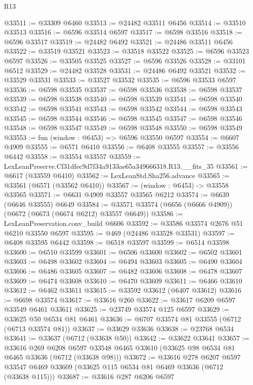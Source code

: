 \begin{lexlean}{R13}
\begin{coremodule}
@33511 := @33309 @6460
@33513 := @24482 @33511 @6456
@33514 := @33510 @33513
@33516 := @6596 @33514 @6597
@33517 := @6598 @33516
@33518 := @6596 @33517
@33519 := @24482 @6492
@33521 := @24486 @33511 @6456
@33522 := @33519 @33521
@33523 := @33518 @33522
@33525 := @6596 @33523 @6597
@33526 := @33505 @33525
@33527 := @6596 @33526
@33528 := @33101 @6512
@33529 := @24482 @33528
@33531 := @24486 @6492 @33521
@33532 := @33529 @33531
@33533 := @33527 @33532
@33535 := @6596 @33533 @6597
@33536 := @6598 @33535
@33537 := @6598 @33536
@33538 := @6598 @33537
@33539 := @6598 @33538
@33540 := @6598 @33539
@33541 := @6598 @33540
@33542 := @6598 @33541
@33543 := @6598 @33542
@33544 := @6598 @33543
@33545 := @6598 @33544
@33546 := @6598 @33545
@33547 := @6598 @33546
@33548 := @6598 @33547
@33549 := @6598 @33548
@33550 := @6598 @33549
@33553 := fun (window : @6453) => @6596 @33550 @6597
@33554 := @6607 @4909
@33555 := @6571 @6410
@33556 := @6408 @33555
@33557 := @33556 @6442
@33558 := @33554 @33557
@33559 := LexLeanPreserve.Cf31dfec9d7f34a9133ae65a349666318.R13.__fits_35
@33561 := @6617 (@33559 @6410)
@33562 := LexLeanStd.Sha256.advance
@33565 := @33561 (@6571 (@33562 @6410))
@33567 := (window : @6453) -> @33558 @33565
@33571 := @6631 @4909 @33557 @33565 @6212
@33574 := @6639 (@6646 @33555) @6649
@33584 := @33571 @33574 (@6656 (@6666 @4909)) (@6672 (@6673 (@6674 @6212) @33557 @6649))
@33586 := LexLeanPreservation.conv_build @6606
@33592 := @33586 @33574 @2676 @51 @6210 @33550 @6597
@33595 := @469 (@24486 @33528 @33531)
@33597 := @6408 @33595 @6442
@33598 := @6518 @33597
@33599 := @6514 @33598
@33600 := @6510 @33599
@33601 := @6506 @33600
@33602 := @6502 @33601
@33603 := @6498 @33602
@33604 := @6494 @33603
@33605 := @6490 @33604
@33606 := @6486 @33605
@33607 := @6482 @33606
@33608 := @6478 @33607
@33609 := @6474 @33608
@33610 := @6470 @33609
@33611 := @6466 @33610
@33612 := @6462 @33611
@33615 := @33592 @33612 (@6407 @33612)
@33616 := @6698 @33574
@33617 := @33616 @260
@33622 := @33617 @6209 @6597 @33549 @6461 @33611
@33625 := @23749 @33574 @125 @6597
@33629 := @33625 @50 @6534 @81 @6461
@33636 := @6707 @33574 @81 @33555 (@6712 (@6713 @33574 @81))
@33637 := @33629 @33636
@33638 := @23768 @6534
@33641 := @33637 (@6712 (@33638 @50))
@33642 := @33622 @33641
@33657 := @33616
    @269
    @6208
    @6597
    @33548
    @6465
    @33610
    (@33625 @98 @6534 @81 @6465 @33636 (@6712 (@33638 @98)))
@33672 := @33616
    @278
    @6207
    @6597
    @33547
    @6469
    @33609
    (@33625 @115 @6534 @81 @6469 @33636 (@6712 (@33638 @115)))
@33687 := @33616
    @287
    @6206
    @6597

\end{coremodule}
\end{lexlean}

